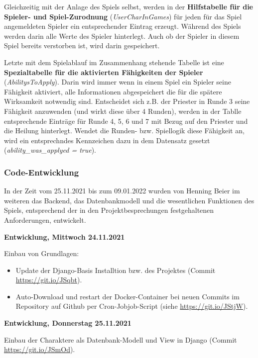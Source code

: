Gleichzeitig mit der Anlage des Spiels selbst, werden in der \textbf{Hilfstabelle für die Spieler- und Spiel-Zurodnung} (\textit{UserCharInGames}) für jeden für das Spiel angemeldeten Spieler ein entsprechender Eintrag erzeugt. Während des Spiels werden darin alle Werte des Spieler hinterlegt. Auch ob der Spieler in diesem Spiel bereits verstorben ist, wird darin gespeichert. 

Letzte mit dem Spielablauf im Zusammenhang stehende Tabelle ist eine \textbf{Spezialtabelle für die aktivierten Fähigkeiten der Spieler} (\textit{AbilitysToApply}). Darin wird immer wenn in einem Spiel ein Spieler seine Fähigkeit aktiviert, alle Informationen abgespeichert die für die spätere Wirksamkeit notwendig sind. Entscheidet sich z.B. der Priester in Runde 3 seine Fähigkeit anzuwenden (und wirkt diese über 4 Runden), werden in der Tablle entsprechende Einträge für Runde 4, 5, 6 und 7 mit Bezug auf den Priester und die Heilung hinterlegt. Wendet die Runden- bzw. Spiellogik diese Fähigkeit an, wird ein entsprechndes Kennzeichen dazu in dem Datensatz gesetzt (\textit{ability\_was\_applyed = true}).





\subsubsection{Code-Entwicklung}

In der Zeit vom 25.11.2021 bis zum 09.01.2022 wurden von Henning Beier im weiteren das Backend, das Datenbankmodell und die wesentlichen Funktionen des Spiels, entsprechend der in den Projektbesprechungen festgehaltenen Anforderungen, entwickelt.



\textbf{Entwicklung, Mittwoch 24.11.2021}

Einbau von Grundlagen: 
\begin{itemize}
    \item Update der Django-Basis Installtion bzw. des Projektes (Commit \url{https://git.io/JSqbt}). 
    \item Auto-Download und restart der Docker-Container bei neuen Commits im Repository auf Github per Cron-Jobjob-Script (siehe \url{https://git.io/JStjW}).
\end{itemize}


\textbf{Entwicklung, Donnerstag 25.11.2021}

Einbau der Charaktere als Datenbank-Modell und View in Django (Commit \url{https://git.io/JSmOd}).



